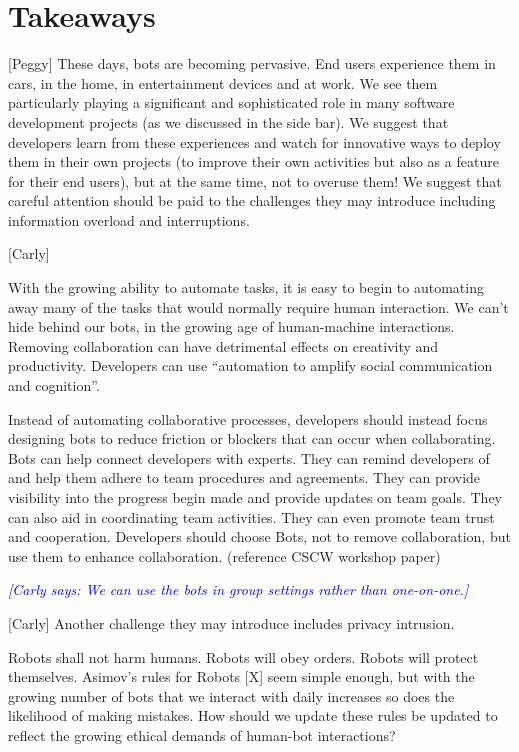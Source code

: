 \documentclass{sig-alternate}
\newcommand{\cl}[1]{\textcolor{blue}{{\it [Carly says: #1]}}}
\begin{document}
\section{Takeaways}

	[Peggy]
	These days, bots are becoming pervasive.  End users experience them in cars, in the home, in entertainment devices and at work.  We see them particularly playing a significant and sophisticated role in many software development projects (as we discussed in the side bar).  
	We suggest that developers learn from these experiences and watch for innovative ways to deploy them in their own projects (to improve their own activities but also as a feature for their end users), but at the same time, not to overuse them! 
	We suggest that careful attention should be paid to the challenges they may introduce including information overload and interruptions.  
	
	
	[Carly]

	With the growing ability to automate tasks, it is easy to begin to automating away many of the tasks that would normally require human interaction.  We can't hide behind our bots, in the growing age of human-machine interactions. Removing collaboration can have detrimental effects on creativity and productivity. Developers can use ``automation to amplify social communication and cognition''.

	Instead of automating collaborative processes, developers should instead focus designing bots to reduce friction or blockers that can occur when collaborating. Bots can help connect developers with experts. They can remind developers of and help them adhere to team procedures and agreements. They can provide visibility into the progress begin made and provide updates on team goals. They can also aid in coordinating team activities. They can even promote team trust and cooperation. Developers should choose Bots, not to remove collaboration, but use them to enhance collaboration. (reference CSCW workshop paper)

	\cl{We can use the bots in group settings rather than one-on-one.}

	[Carly]
	Another challenge they may introduce includes privacy intrusion. 

	Robots shall not harm humans. Robots will obey orders. Robots will protect themselves.  Asimov's rules for Robots [X] seem simple enough, but with the growing number of bots that we interact with daily increases so does the likelihood of making mistakes. How should we update these rules be updated to reflect the growing ethical demands of human-bot interactions?
\end{document}
